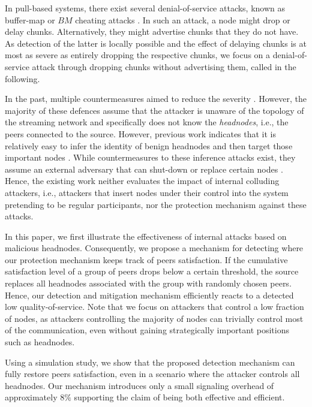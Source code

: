 In pull-based systems, there exist several denial-of-service attacks, known as buffer-map or $BM$ cheating attacks \cite{cheatingAnalysis}. 
In such an attack, a node might drop or delay chunks. Alternatively, they might advertise chunks that they do not have. As detection of the latter is locally possible and the effect of delaying chunks is at most as severe as entirely dropping the respective chunks, we focus on a denial-of-service attack through dropping chunks without advertising them, called \drop in the following.  


In the past, multiple countermeasures aimed to reduce the severity \drop. However, the majority of these defences \cite{zhang2005coolstreaming, defending2, antiliar} assume that the attacker is unaware of the topology of the streaming network and specifically does not know the \emph{headnodes}, i.e., the peers connected to the source. 
However, previous work indicates that it is relatively easy to infer the identity of benign headnodes and then target those important nodes \cite{nguyen2016swap}.
While countermeasures to these inference attacks exist, they assume an external adversary that can shut-down or replace certain nodes \cite{nguyen2016swap, rbcs, nguyen2014resilience}. 
Hence, the existing work neither evaluates the impact of internal colluding attackers, i.e., attackers that insert nodes under their control into the system pretending to be regular participants, nor the protection mechanism against these attacks.


In this paper, we first illustrate the effectiveness of internal attacks based on malicious headnodes. 
Consequently, we propose a mechanism for detecting \drop where our protection mechanism keeps track of peers satisfaction. If the cumulative satisfaction level of a group of peers drops below a certain threshold, the source replaces all headnodes associated with the group with randomly chosen peers. 
Hence, our detection and mitigation mechanism efficiently reacts to a detected low quality-of-service.
Note that we focus on attackers that control a low fraction of nodes, as attackers controlling the majority of nodes can trivially control most of the communication, even without gaining strategically important positions such as headnodes.    

Using a simulation study, we show that the proposed detection mechanism can fully restore peers satisfaction, even in a scenario where the attacker controls all headnodes. 
Our mechanism introduces only a small signaling overhead of approximately $8\%$ supporting the claim of being both effective and efficient.

